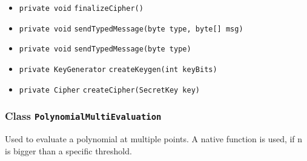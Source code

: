\begin{itemize}
\item \lstinline|private void| \lstinline|finalizeCipher|\lstinline|()| \\[-0.6em]




\item \lstinline|private void| \lstinline|sendTypedMessage|\lstinline|(byte type, byte[] msg)| \\[-0.6em]




\item \lstinline|private void| \lstinline|sendTypedMessage|\lstinline|(byte type)| \\[-0.6em]




\item \lstinline|private KeyGenerator| \lstinline|createKeygen|\lstinline|(int keyBits)| \\[-0.6em]




\item \lstinline|private Cipher| \lstinline|createCipher|\lstinline|(SecretKey key)| \\[-0.6em]




\end{itemize}

\subsubsection{Class \lstinline|PolynomialMultiEvaluation|}
Used to evaluate a polynomial at multiple points. A native function is used, if n
 is bigger than a specific threshold. \\
\noindent\begin{minipage}[t]{5cm}
\vspace{0.3em}
\hspace*{2em}
\vspace{0.3em}
\end{minipage}




